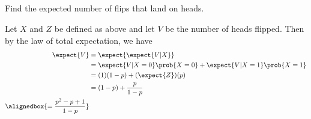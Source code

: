 \documentclass[hwnumber=5,studentnumber=20053722]{mthe353answer}
\begin{document}
\begin{questions}
\begin{parts}
      \part{}
      Find the expected number of flips that land on heads.
      \begin{solution}
        Let \(X\) and \(Z\) be defined as above and let \(V\) be the number of
        heads flipped. Then by the law of total expectation, we have
        \begin{align*}
          \expect{V} &= \expect{\expect{V|X}}\\
          &= \expect{V|X=0}\prob{X=0} + \expect{V|X=1}\prob{X=1}\\
          &= (1)(1-p) + (\expect{Z})(p)\\
          &= (1-p) + \frac{p}{1-p}\\
          \alignedbox{=\frac{p^2 - p + 1}{1-p}}
        \end{align*}
      \end{solution}
    \end{parts}
  \end{questions}
\end{document}
